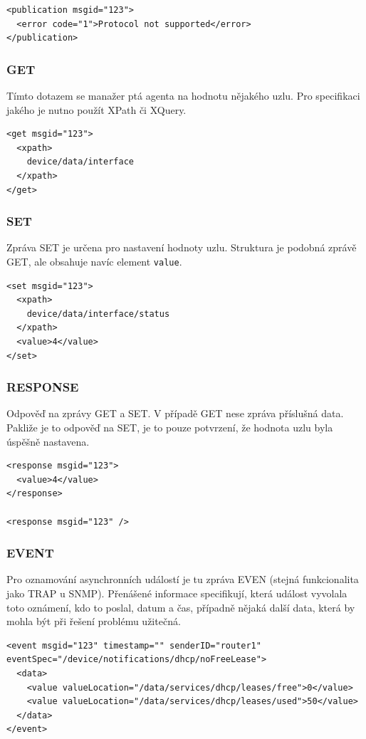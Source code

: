 \begin{verbatim}
<publication msgid="123">
  <error code="1">Protocol not supported</error>
</publication>
\end{verbatim}

\subsubsection*{GET}
Tímto dotazem se manažer ptá agenta na hodnotu nějakého uzlu. Pro specifikaci jakého je nutno použít XPath či XQuery.

\begin{verbatim}
<get msgid="123">
  <xpath>
    device/data/interface
  </xpath>
</get>
\end{verbatim}


\subsubsection*{SET}
Zpráva SET je určena pro nastavení hodnoty uzlu. Struktura je podobná zprávě GET, ale obsahuje navíc element \verb|value|.

\begin{verbatim}
<set msgid="123">
  <xpath>
    device/data/interface/status
  </xpath>
  <value>4</value>
</set>
\end{verbatim}

\subsubsection*{RESPONSE}
Odpověď na zprávy GET a SET. V případě GET nese zpráva příslušná data. Pakliže je to odpověď na SET, je to pouze potvrzení, že hodnota uzlu byla úspěšně nastavena.

\begin{verbatim}
<response msgid="123">
  <value>4</value>
</response>

<response msgid="123" />
\end{verbatim}

\subsubsection*{EVENT}
Pro oznamování asynchronních událostí je tu zpráva EVEN (stejná funkcionalita jako TRAP u SNMP). Přenášené informace specifikují, která událost vyvolala toto oznámení,
kdo to poslal, datum a čas, případně nějaká další data, která by mohla být při řešení problému užitečná.

\begin{verbatim}
<event msgid="123" timestamp="" senderID="router1" eventSpec="/device/notifications/dhcp/noFreeLease">
  <data>
    <value valueLocation="/data/services/dhcp/leases/free">0</value>
    <value valueLocation="/data/services/dhcp/leases/used">50</value>
  </data>
</event>
\end{verbatim}

